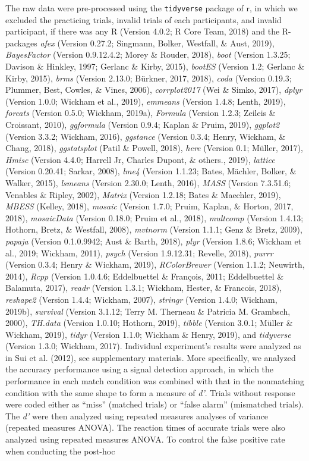 \documentclass[
  english,
  man]{apa6}
\begin{document}
The raw data were pre-processed using the \texttt{tidyverse} package of r, in which we excluded the practicing trials, invalid trials of each participants, and invalid participant, if there was any R (Version 4.0.2; R Core Team, 2018) and the R-packages \emph{afex} (Version 0.27.2; Singmann, Bolker, Westfall, \& Aust, 2019), \emph{BayesFactor} (Version 0.9.12.4.2; Morey \& Rouder, 2018), \emph{boot} (Version 1.3.25; Davison \& Hinkley, 1997; Gerlanc \& Kirby, 2015), \emph{bootES} (Version 1.2; Gerlanc \& Kirby, 2015), \emph{brms} (Version 2.13.0; Bürkner, 2017, 2018), \emph{coda} (Version 0.19.3; Plummer, Best, Cowles, \& Vines, 2006), \emph{corrplot2017} (Wei \& Simko, 2017), \emph{dplyr} (Version 1.0.0; Wickham et al., 2019), \emph{emmeans} (Version 1.4.8; Lenth, 2019), \emph{forcats} (Version 0.5.0; Wickham, 2019a), \emph{Formula} (Version 1.2.3; Zeileis \& Croissant, 2010), \emph{ggformula} (Version 0.9.4; Kaplan \& Pruim, 2019), \emph{ggplot2} (Version 3.3.2; Wickham, 2016), \emph{ggstance} (Version 0.3.4; Henry, Wickham, \& Chang, 2018), \emph{ggstatsplot} (Patil \& Powell, 2018), \emph{here} (Version 0.1; Müller, 2017), \emph{Hmisc} (Version 4.4.0; Harrell Jr, Charles Dupont, \& others., 2019), \emph{lattice} (Version 0.20.41; Sarkar, 2008), \emph{lme4} (Version 1.1.23; Bates, Mächler, Bolker, \& Walker, 2015), \emph{lsmeans} (Version 2.30.0; Lenth, 2016), \emph{MASS} (Version 7.3.51.6; Venables \& Ripley, 2002), \emph{Matrix} (Version 1.2.18; Bates \& Maechler, 2019), \emph{MBESS} (Kelley, 2018), \emph{mosaic} (Version 1.7.0; Pruim, Kaplan, \& Horton, 2017, 2018), \emph{mosaicData} (Version 0.18.0; Pruim et al., 2018), \emph{multcomp} (Version 1.4.13; Hothorn, Bretz, \& Westfall, 2008), \emph{mvtnorm} (Version 1.1.1; Genz \& Bretz, 2009), \emph{papaja} (Version 0.1.0.9942; Aust \& Barth, 2018), \emph{plyr} (Version 1.8.6; Wickham et al., 2019; Wickham, 2011), \emph{psych} (Version 1.9.12.31; Revelle, 2018), \emph{purrr} (Version 0.3.4; Henry \& Wickham, 2019), \emph{RColorBrewer} (Version 1.1.2; Neuwirth, 2014), \emph{Rcpp} (Version 1.0.4.6; Eddelbuettel \& François, 2011; Eddelbuettel \& Balamuta, 2017), \emph{readr} (Version 1.3.1; Wickham, Hester, \& Francois, 2018), \emph{reshape2} (Version 1.4.4; Wickham, 2007), \emph{stringr} (Version 1.4.0; Wickham, 2019b), \emph{survival} (Version 3.1.12; Terry M. Therneau \& Patricia M. Grambsch, 2000), \emph{TH.data} (Version 1.0.10; Hothorn, 2019), \emph{tibble} (Version 3.0.1; Müller \& Wickham, 2019), \emph{tidyr} (Version 1.1.0; Wickham \& Henry, 2019), and \emph{tidyverse} (Version 1.3.0; Wickham, 2017). Individual experiment's results were analyzed as in Sui et al. (2012), see supplementary materials. More specifically, we analyzed the accuracy performance using a signal detection approach, in which the performance in each match condition was combined with that in the nonmatching condition with the same shape to form a measure of \emph{d'}. Trials without response were coded either as \enquote{miss} (matched trials) or \enquote{false alarm} (mismatched trials). The \emph{d'} were then analyzed using repeated measures analyses of variance (repeated measures ANOVA). The reaction times of accurate trials were also analyzed using repeated measures ANOVA. To control the false positive rate when conducting the post-hoc 
\end{document}
